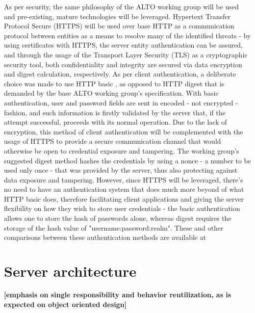     As per security, the same philosophy of the ALTO working group will be used and pre-existing, mature technologies will be leveraged.
    Hypertext Transfer Protocol Secure (HTTPS) will be used over base HTTP as a communication protocol between entities as a means to resolve many of the identified threats - by using certificates with HTTPS, the server entity authentication can be assured, and through the usage of the Transport Layer Security (TLS) as a cryptographic security tool, both confidentiality and integrity are secured via data encryption and digest calculation, respectively.
    As per client authentication, a deliberate choice was made to use HTTP basic \cite{http-basic}, as opposed to HTTP digest \cite{http-digest} that is demanded by the base ALTO working group's specification.
    With basic authentication, user and password fields are sent in encoded - not encrypted - fashion, and such information is firstly validated by the server that, if the attempt successful, proceeds with its normal operation.
    Due to the lack of encryption, this method of client authentication will be complemented with the usage of HTTPS to provide a secure communication channel that would otherwise be open to credential exposure and tampering.
    The working group's suggested digest method hashes the credentials by using a nonce - a number to be used only once - that was provided by the server, thus also protecting against data exposure and tampering.
    However, since HTTPS will be leveraged, there's no need to have an authentication system that does much more beyond of what HTTP basic does, therefore facilitating client applications and giving the server flexibility on how they wish to store user credentials - the basic authentication allows one to store the hash of passwords alone, whereas digest requires the storage of the hash value of "username:password:realm".
    These and other comparisons between these authentication methods are available at \cite{https://sci-hub.se/https://link.springer.com/chapter/10.1007/978-1-4302-6817-8_3}


\section{Server architecture}


    \textbf{[emphasis on single responsibility and behavior reutilization, as is expected on object oriented design]}

